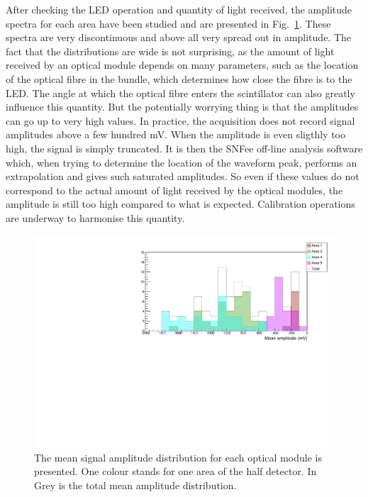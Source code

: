 After checking the LED operation and quantity of light received, the amplitude spectra for each area have been studied and are presented in Fig.~\ref{fig:LI_ampl}.
These spectra are very discontinuous and above all very spread out in amplitude.
The fact that the distributions are wide is not surprising, as the amount of light received by an optical module depends on many parameters, such as the location of the optical fibre in the bundle, which determines how close the fibre is to the LED.
The angle at which the optical fibre enters the scintillator can also greatly influence this quantity.
But the potentially worrying thing is that the amplitudes can go up to very high values.
In practice, the acquisition does not record signal amplitudes above a few hundred mV.
When the amplitude is even sligthly too high, the signal is simply truncated.
It is then the SNFee off-line analysis software which, when trying to determine the location of the waveform peak, performs an extrapolation and gives such saturated amplitudes.
So even if these values do not correspond to the actual amount of light received by the optical modules, the amplitude is still too high compared to what is expected.
Calibration operations are underway to harmonise this quantity.
\begin{figure}[h!]
  \centering
  \includegraphics[width=15cm]{commissioning/fig_commissioning/LI_mean_ampl.pdf}
  \caption{The mean signal amplitude distribution for each optical module is presented.
    One colour stands for one area of the half detector.
    In Grey is the total mean amplitude distribution.
    \label{fig:LI_ampl}}
\end{figure}

